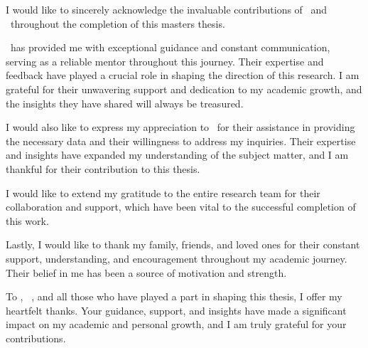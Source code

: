 
\begin{acknowledgements}
\addchaptertocentry{\acknowledgementname} %

I would like to sincerely acknowledge the invaluable contributions of \supnameA \ and \supnameB \ throughout the completion of this masters thesis.

\supnameA \ has provided me with exceptional guidance and constant communication, serving as a reliable mentor throughout this journey. Their expertise and feedback have played a crucial role in shaping the direction of this research. I am grateful for their unwavering support and dedication to my academic growth, and the insights they have shared will always be treasured.

I would also like to express my appreciation to \supnameB \ for their assistance in providing the necessary data and their willingness to address my inquiries. Their expertise and insights have expanded my understanding of the subject matter, and I am thankful for their contribution to this thesis.

I would like to extend my gratitude to the entire research team for their collaboration and support, which have been vital to the successful completion of this work.

Lastly, I would like to thank my family, friends, and loved ones for their constant support, understanding, and encouragement throughout my academic journey. Their belief in me has been a source of motivation and strength.

To \supnameA , \ \supnameB , and all those who have played a part in shaping this thesis, I offer my heartfelt thanks. Your guidance, support, and insights have made a significant impact on my academic and personal growth, and I am truly grateful for your contributions.
\end{acknowledgements}

